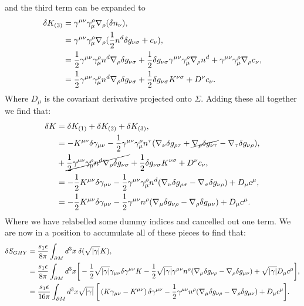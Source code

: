 and the third term can be expanded to
\begin{equation*}
\begin{aligned}
		\delta K_{(3)} &= \gamma^{\mu \nu} \gamma^\rho_\mu \nabla_\rho (\delta n_\nu), \\
		&=  \gamma^{\mu \nu} \gamma^\rho_\mu \nabla_\rho (\frac{1}{2} n^d \delta g_{\nu \sigma} + c_\nu ), \\
		&= \frac{1}{2}  \gamma^{\mu \nu} \gamma^\rho_\mu n^d \nabla_\rho \delta g_{\nu \sigma} + \frac{1}{2}  \delta g_{\nu \sigma} \gamma^{\mu \nu} \gamma^\rho_\mu \nabla_\rho n^d + \gamma^{\mu \nu} \gamma^\rho_\mu \nabla_\rho c_\nu ,\\
		&= \frac{1}{2}  \gamma^{\mu \nu} \gamma^\rho_\mu n^d \nabla_\rho \delta g_{\nu \sigma} + \frac{1}{2}  \delta g_{\nu \sigma} K^{\nu \sigma} + D^\nu c_\nu. \\
\end{aligned}
\end{equation*}
Where $D_\mu$ is the covariant derivative projected onto $\Sigma$. Adding these all together we find that:
\begin{equation*}
	\begin{aligned}
		\delta K &= \delta K_{(1)} + \delta K_{(2)} + \delta K_{(3)}, \\
		&= -K^{\mu \nu} \delta \gamma_{\mu \nu} -\frac{1}{2} \gamma^{\mu \nu} \gamma^\rho_\mu n^\tau (\nabla_\nu \delta g_{\rho \tau} + \cancel{\nabla_\rho \delta g_{\nu \tau}} - \nabla_\tau \delta g_{\nu \rho}), \\
		&+ \cancel{\frac{1}{2}  \gamma^{\mu \nu} \gamma^\rho_\mu n^d \nabla_\rho \delta g_{\nu \sigma}} + \frac{1}{2}  \delta g_{\nu \sigma} K^{\nu \sigma} + D^\nu c_\nu, \\
		&= - \frac{1}{2} K^{\mu \nu} \delta \gamma_{\mu \nu} -\frac{1}{2} \gamma^{\mu \nu} \gamma^\rho_\mu n^d (\nabla_\nu \delta g_{\rho \sigma} - \nabla_\sigma \delta g_{\nu \rho}) + D_\mu c^\mu, \\
		&= - \frac{1}{2} K^{\mu \nu} \delta \gamma_{\mu \nu} -\frac{1}{2}   \gamma^{\mu \nu} n^\rho (\nabla_\mu \delta g_{\nu \rho} - \nabla_\rho \delta g_{\mu \nu}) + D_\mu c^\mu .
	\end{aligned}
\end{equation*}
Where we have relabelled some dummy indices and cancelled out one term. We are now in a position to accumulate all of these pieces to find that:
\begin{equation*}
\begin{aligned}
		\delta S_{GHY} &= \frac{s_1  \epsilon}{8 \pi} \int_{\partial M}  d^3x \; \delta(\sqrt{|\gamma|} K),  \\
		&= \frac{s_1  \epsilon}{8 \pi} \int_{\partial M}  d^3x \bigg[-\frac{1}{2} \sqrt{|\gamma|} \gamma_{\mu \nu} \delta \gamma^{\mu \nu} K  -\frac{1}{2}  \sqrt{|\gamma|}  \gamma^{\mu \nu} n^\rho (\nabla_\mu \delta g_{\nu \rho} - \nabla_\rho \delta g_{\mu \nu}) +  \sqrt{|\gamma|} D_\mu c^\mu \bigg] , \\
		&= \frac{s_1 \epsilon}{16 \pi} \int_{\partial M}  d^3x \sqrt{|\gamma|} \; \bigg[ \left(K \gamma_{\mu \nu} - K^{\mu \nu} \right) \delta \gamma^{\mu \nu} -\frac{1}{2}   \gamma^{\mu \nu} n^\rho (\nabla_\mu \delta g_{\nu \rho} - \nabla_\rho \delta g_{\mu \nu}) + D_\mu c^\mu \bigg].
\end{aligned}
\end{equation*}
